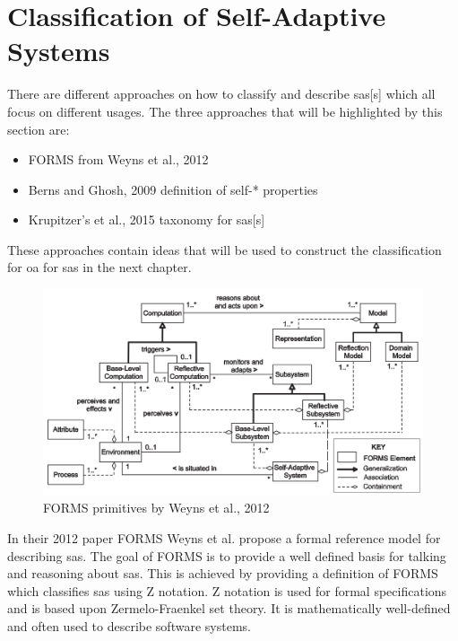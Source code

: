 \section{Classification of Self-Adaptive Systems}
\label{ch:SASClassification}

There are different approaches on how to classify and describe \acrlong{sas}[s] which all focus on different usages.
The three approaches that will be highlighted by this section are:
\begin{itemize}[nosep]
    \item FORMS from Weyns et al., 2012 \cite*{FORMS}
    \item Berns and Ghosh, 2009 definition of self-* properties \cite*{DissectingSelfProperties}
    \item Krupitzer's et al., 2015 taxonomy for \acrlong{sas}[s] \cite*{SurveyOnEngineeringApproaches}
\end{itemize} 
These approaches contain ideas that will be used to construct the classification for
\acrshort{oa} for \acrshort{sas} in the next chapter.

\begin{figure}[b!]
    \centering
    \includegraphics[width=\textwidth]{images/FORMS.png}
    \caption{FORMS primitives by Weyns et al., 2012 \cite*{FORMS}}
    \label{fig:FORMS}
\end{figure}
\noindent In their 2012 paper FORMS \cite{FORMS} Weyns et al. propose a formal reference model for describing \acrshort{sas}.
The goal of FORMS is to provide a well defined basis for talking and reasoning about \acrshort{sas}.
This is achieved by providing a definition of FORMS which classifies \acrshort{sas} using Z notation.
Z notation is used for formal specifications and is based upon Zermelo-Fraenkel set theory.
It is mathematically well-defined and often used to describe software systems.

